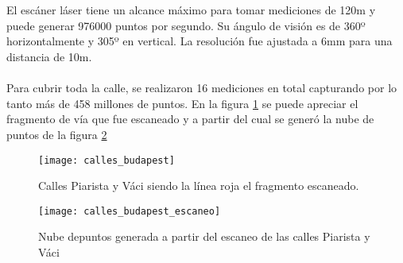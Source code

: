 \\
\\
El escáner láser tiene un alcance máximo para tomar mediciones de 120m y puede generar 976000 puntos por segundo. Su ángulo de visión es de 360º horizontalmente y 305º en vertical. La resolución fue ajustada a 6mm para una distancia de 10m.
\\
\\
Para cubrir toda la calle, se realizaron 16 mediciones en total capturando por lo tanto más de 458 millones de puntos. En la figura \ref{fig:calles_budapest} se puede apreciar el fragmento de vía que fue escaneado y a partir del cual se generó la nube de puntos de la figura \ref{fig:calles_budapest_escaneo}

\begin{figure}[!htb]
\centering
{}
  \texttt{[image: calles\_budapest]}
  \caption{Calles Piarista y Váci siendo la línea roja el fragmento escaneado.}\label{fig:calles_budapest}
\endminipage\hfill

\end{figure}

\begin{figure}[!htb]
\centering
{}
  \texttt{[image: calles\_budapest\_escaneo]}
  \caption{Nube depuntos generada a partir del escaneo de las calles Piarista y Váci}\label{fig:calles_budapest_escaneo}
\endminipage\hfill

\end{figure}

